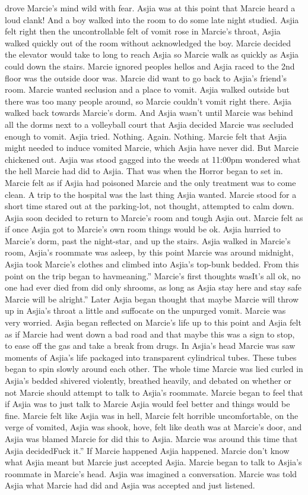 \documentclass[12pt]{book}
\begin{document}
drove Marcie's mind wild with fear. Asjia was at this point that Marcie heard a loud clank! And a boy walked into the room to do some late night studied. Asjia felt right then the uncontrollable felt of vomit rose in Marcie's throat, Asjia walked quickly out of the room without acknowledged the boy. Marcie decided the elevator would take to long to reach Asjia so Marcie walk as quickly as Asjia could down the stairs. Marcie ignored peoples hellos and Asjia raced to the 2nd floor was the outside door was. Marcie did want to go back to Asjia's friend's room. Marcie wanted seclusion and a place to vomit. Asjia walked outside but there was too many people around, so Marcie couldn't vomit right there. Asjia walked back towards Marcie's dorm. And Asjia wasn't until Marcie was behind all the dorms next to a volleyball court that Asjia decided Marcie was secluded enough to vomit. Asjia tried. Nothing. Again. Nothing. Marcie felt that Asjia might needed to induce vomited Marcie, which Asjia have never did. But Marcie chickened out. Asjia was stood gagged into the weeds at 11:00pm wondered what the hell Marcie had did to Asjia. That was when the Horror began to set in. Marcie felt as if Asjia had poisoned Marcie and the only treatment was to come clean. A trip to the hospital was the last thing Asjia wanted. Marcie stood for a short time stared out at the parking-lot, not thought, attempted to calm down. Asjia soon decided to return to Marcie's room and tough Asjia out. Marcie felt as if once Asjia got to Marcie's own room things would be ok. Asjia hurried to Marcie's dorm, past the night-star, and up the stairs. Asjia walked in Marcie's room, Asjia's roommate was asleep, by this point Marcie was around midnight, Asjia took Marcie's clothes and climbed into Asjia's top-bunk bedded. From this point on the trip began to havmeaning.'' Marcie's first thoughts wasIt's all ok, no one had ever died from did only shrooms, as long as Asjia stay here and stay safe Marcie will be alright.'' Later Asjia began thought that maybe Marcie will throw up in Asjia's throat a little and suffocate on the unpurged vomit. Marcie was very worried. Asjia began reflected on Marcie's life up to this point and Asjia felt as if Marcie had went down a bad road and that maybe this was a sign to stop, to ease off the gas and take a break from drugs. In Asjia's head Marcie was saw moments of Asjia's life packaged into transparent cylindrical tubes. These tubes began to spin slowly around each other. The whole time Marcie was lied curled in Asjia's bedded shivered violently, breathed heavily, and debated on whether or not Marcie should attempt to talk to Asjia's roommate. Marcie began to feel that if Asjia was to just talk to Marcie Asjia would feel better and things would be fine. Marcie felt like Asjia was in hell, Marcie felt horrible uncomfortable, on the verge of vomited, Asjia was shook, hove, felt like death was at Marcie's door, and Asjia was blamed Marcie for did this to Asjia. Marcie was around this time that Asjia decidedFuck it.'' If Marcie happened Asjia happened. Marcie don't know what Asjia meant but Marcie just accepted Asjia. Marcie began to talk to Asjia's roommate in Marcie's head. Asjia was imagined a conversation. Marcie was told Asjia what Marcie had did and Asjia was accepted and just listened. 
\end{document}
